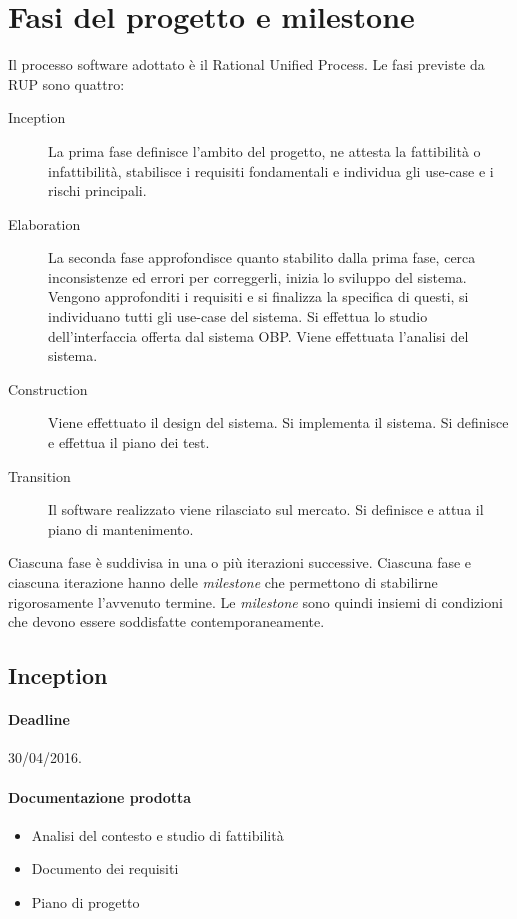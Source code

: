 \section{Fasi del progetto e milestone}

Il processo software adottato \`e il Rational Unified Process.
Le fasi previste da RUP sono quattro:
\begin{description}
	\item[Inception]
	La prima fase definisce l'ambito del progetto, ne attesta la fattibilit\`a o infattibilit\`a, stabilisce i requisiti fondamentali e individua gli use-case e i rischi principali.
	\item[Elaboration]
	La seconda fase approfondisce quanto stabilito dalla prima fase, cerca inconsistenze ed errori per correggerli, inizia lo sviluppo del sistema.
	Vengono approfonditi i requisiti e si finalizza la specifica di questi, si individuano tutti gli use-case del sistema.
	Si effettua lo studio dell'interfaccia offerta dal sistema OBP.
	Viene effettuata l'analisi del sistema.
	\item[Construction]
	Viene effettuato il design del sistema.
	Si implementa il sistema.
	Si definisce e effettua il piano dei test.
	\item[Transition]
	Il software realizzato viene rilasciato sul mercato.
	Si definisce e attua il piano di mantenimento.
\end{description}

Ciascuna fase \`e suddivisa in una o pi\`u iterazioni successive.
Ciascuna fase e ciascuna iterazione hanno delle \emph{milestone} che permettono di stabilirne rigorosamente l'avvenuto termine.
Le \emph{milestone} sono quindi insiemi di condizioni che devono essere soddisfatte contemporaneamente.

\subsection{Inception}

\paragraph{Deadline}
30/04/2016.

\paragraph{Documentazione prodotta}
\begin{itemize}
	\item Analisi del contesto e studio di fattibilit\`a
	\item Documento dei requisiti
	\item Piano di progetto
\end{itemize}

